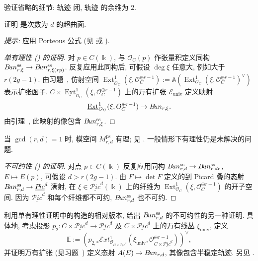 \begin{exercise}[中等]\label{src:9.4.6}
验证省略的细节: 轨迹  闭, 轨迹  的余维为 $2$.
\end{exercise}
\begin{exercise}[困难, 后文需要]\label{src:9.4.7}
证明  是次数为 $d$ 的超曲面.

\textit{提示:} 应用 Porteous 公式 (见 \cite[\S14.4]{Ful98} 或 \cite[\S12.2]{EH16}).
\end{exercise}
\begin{proof}[单有理性 () 的证明]
对 $p\in C(\Bbbk)$, 与 $\mathcal O_C(p)$ 作张量积定义同构 $B\!un_{r,\xi}^{\mathrm{ss}}\to B\!un_{r,\xi(rp)}^{\mathrm{ss}}$. 反复应用此同构后, 可假设 $\deg\xi$ 任意大, 例如大于 $r(2g-1)$. 由习题~, 仿射空间 $\underline{\operatorname{Ext}}_{\mathcal O_C}^1(\xi,\mathcal O_C^{\oplus r-1}):=\mathbb A(\operatorname{Ext}_{\mathcal O_C}^1(\xi,\mathcal O_C^{\oplus r-1})^\vee)$ 表示扩张函子. $C\times\underline{\operatorname{Ext}}_{\mathcal O_C}^1(\xi,\mathcal O_C^{\oplus r-1})$ 上的万有扩张 $\mathcal E_{\mathrm{univ}}$ 定义映射
\[
\underline{\operatorname{Ext}}_{O_C}^1(\xi,O_C^{\oplus r-1})\to B\!un_{r,\xi}.
\]
由引理~, 此映射的像包含 $B\!un_{r,\xi}^{\mathrm{ss}}$.
\end{proof}
\begin{remark}[有理性]\label{src:9.4.8}
当 $\gcd(r,d)=1$ 时, 模空间 $M_{r,d}^{\mathrm{ps}}$ 有理; 见 \cite{New75,New80,KS99,Hof10}. 一般情形下有理性仍是未解决的问题.
\end{remark}
\begin{proof}[不可约性 () 的证明]
对点 $p\in C(\Bbbk)$ 反复应用同构 $B\!un_{r,d}^{\mathrm{ss}}\to B\!un_{r,dr}^{\mathrm{ss}}$, $E\mapsto E(p)$, 可假设 $d>r(2g-1)$. 由 $F\mapsto\det F$ 定义的到 Picard 叠的态射 $B\!un_{r,d}^{\mathrm{ss}}\to\underline{P\!ic}^d$ 满射, 在 $\xi\in\underline{\mathcal P\!ic}^d(\Bbbk)$ 上的纤维为 $\operatorname{Ext}_{\mathcal O_C}^1(\xi,\mathcal O_C^{\oplus r-1})$ 的开子空间. 因为 $\underline{\mathcal P\!ic}^d$ 和每个纤维都不可约, $B\!un_{r,d}^{\mathrm{ss}}$ 也不可约.
\end{proof}
\begin{exercise}\label{src:9.4.9}
利用单有理性证明中的构造的相对版本, 给出 $B\!un_{r,d}^{\mathrm{ss}}$ 的不可约性的另一种证明. 具体地, 考虑投影 $p_2:C\times\underline{\mathcal P\!ic}^d\to\underline{\mathcal P\!ic}^d$ 及 $C\times\underline{\mathcal P\!ic}^d$ 上的万有线丛 $\xi_{\mathrm{univ}}$, 定义
\[
\mathbb E:=\left(p_{2,*}\mathcal E\!xt_{\mathcal O_{C\times\underline{\mathcal P\!ic}^d}}^1
(\xi_{\mathrm{univ}},\mathcal O_{C\times\underline{\mathcal P\!ic}^d}^{\oplus r-1})\right)^\vee,
\]
并证明万有扩张 (见习题~) 定义态射 $A(E)\to B\!un_{r,d}$, 其像包含半稳定轨迹. 另见 \cite[定理 8.5.2]{LP97}.
\end{exercise}
